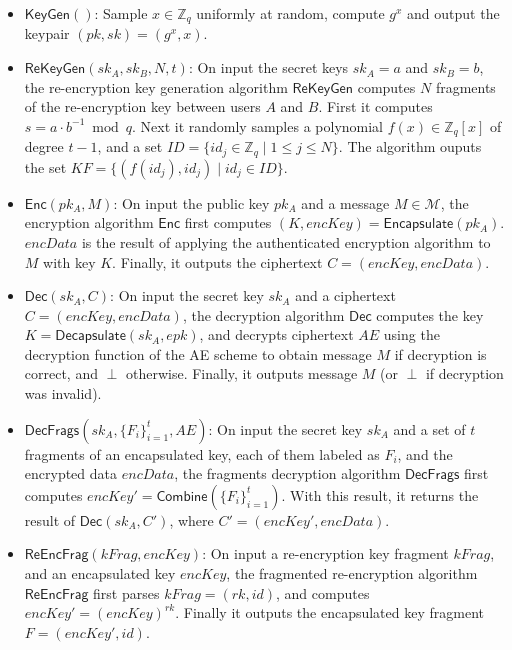 \documentclass[12pt]{article}
\begin{document}
\begin{itemize}
	\item $\mathsf{KeyGen}()$: Sample $x \in \mathbb Z_q$ uniformly at random, compute $g^x$ and output the keypair $(pk, sk) = (g^x, x)$.

	\item $\mathsf{ReKeyGen}(sk_A, sk_B, N, t)$: On input the secret keys $sk_{A} = a$ and $sk_{B} = b$, the re-encryption key generation algorithm $\mathsf{ReKeyGen}$ computes $N$ fragments of the re-encryption key between users $A$ and $B$. 
	First it computes $s = a \cdot b^{-1} \bmod q$. Next it randomly samples a polynomial $f(x) \in \mathbb Z_q[x]$ of degree $t-1$, and a set $ID = \{ id_j \in \mathbb Z_q\mid 1 \leq j \leq N\}$. The algorithm ouputs the set $KF = \{ ( f(id_j), id_j) \mid id_j \in ID\}$.

	\item $\mathsf{Enc}(pk_A, M)$: On input the public key $pk_A$ and a message $M\in\mathcal{M}$, the encryption algorithm $\mathsf{Enc}$ first computes $(K, encKey) = \mathsf{Encapsulate}(pk_A)$.  
	$encData$ is the result of applying the authenticated encryption algorithm to $M$ with key $K$. 
	Finally, it outputs the ciphertext $C = (encKey, encData)$.
	
		\item $\mathsf{Dec}(sk_A, C)$: On input the secret key $sk_A$ and a ciphertext $C = (encKey, encData)$, the decryption algorithm $\mathsf{Dec}$ %
		computes the key $K = \mathsf{Decapsulate}(sk_A, epk)$, and decrypts ciphertext $AE$ using the decryption function of the AE scheme to obtain message $M$ if decryption is correct, and $\perp$ otherwise. Finally, it outputs message $M$ (or $\perp$ if decryption was invalid).
		
		\item $\mathsf{DecFrags}(sk_A, \{F_i\}_{i=1}^t, AE)$: On input the secret key $sk_A$ and a set of $t$ fragments of an encapsulated key, each of them labeled as $F_i$, and the encrypted data $encData$, the fragments decryption algorithm $\mathsf{DecFrags}$ first computes $encKey' = \mathsf{Combine}(\{F_i\}_{i=1}^t)$. With this result, it returns the result of $\mathsf{Dec}(sk_A, C')$, where $C' = (encKey', encData)$. %

	
	\item $\mathsf{ReEncFrag}(kFrag, encKey)$: On input a re-encryption key fragment $kFrag$, and an encapsulated key $encKey$, the fragmented re-encryption algorithm $\mathsf{ReEncFrag}$ first parses $kFrag = (rk, id)$, 
	and computes $encKey' = (encKey)^{rk}$. Finally it outputs the encapsulated key fragment $F = (encKey', id)$. 
\end{itemize}
\end{document}
